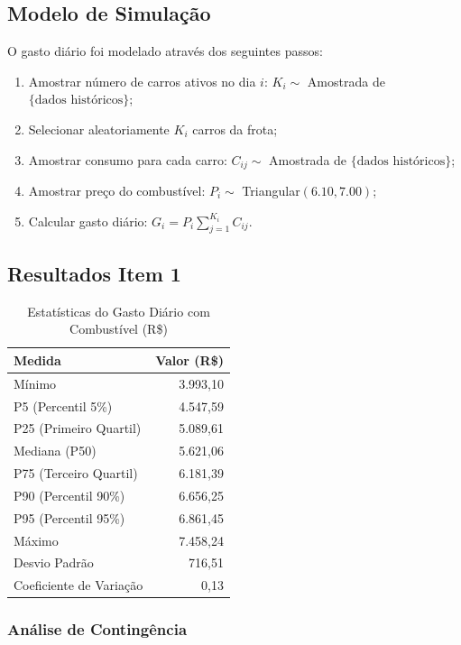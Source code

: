 \documentclass[12pt,a4paper]{article}
\begin{document}
\subsection{Modelo de Simulação}

O gasto diário foi modelado através dos seguintes passos:

\begin{enumerate}
    \item Amostrar número de carros ativos no dia $i$: $K_i \sim$ Amostrada de $\{\text{dados históricos}\}$;
    \item Selecionar aleatoriamente $K_i$ carros da frota;
    \item Amostrar consumo para cada carro: $C_{ij} \sim$ Amostrada de $\{\text{dados históricos}\}$;
    \item Amostrar preço do combustível: $P_i \sim$ Triangular$(6.10, 7.00)$;
    \item Calcular gasto diário: $G_i = P_i \sum_{j=1}^{K_i} C_{ij}$.
\end{enumerate}

\subsection{Resultados Item 1}

\begin{table}[H]
\centering
\caption{Estatísticas do Gasto Diário com Combustível (R\$)}
\label{tab:gasto_combustivel}
\begin{tabular}{lr}
\toprule
\textbf{Medida} & \textbf{Valor (R\$)} \\
\midrule
Mínimo & 3.993,10 \\
P5 (Percentil 5\%) & 4.547,59 \\
P25 (Primeiro Quartil) & 5.089,61 \\
Mediana (P50) & 5.621,06 \\
P75 (Terceiro Quartil) & 6.181,39 \\
P90 (Percentil 90\%) & 6.656,25 \\
P95 (Percentil 95\%) & 6.861,45 \\
Máximo & 7.458,24 \\
\midrule
Desvio Padrão & 716,51 \\
Coeficiente de Variação & 0,13 \\
\bottomrule
\end{tabular}
\end{table}

\subsubsection{Análise de Contingência}
\end{document}
